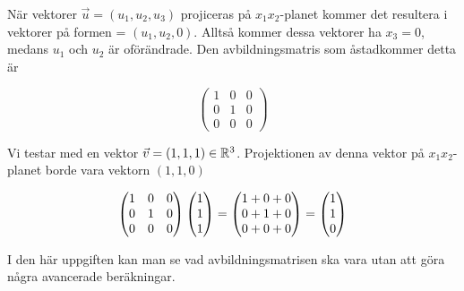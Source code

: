 \documentclass[../../main.tex]{subfiles}
\begin{document}
\begin{solution}{9}

När vektorer $\Vec{u} = (u_1, u_2, u_3)$ projiceras på $x_1x_2$-planet kommer det resultera i vektorer på formen = $(u_1, u_2, 0)$. Alltså kommer dessa vektorer ha $x_3=0$, medans $u_1$ och $u_2$ är oförändrade. Den avbildningsmatris som åstadkommer detta är

$$\begin{pmatrix}
1&0&0\\0&1&0\\0&0&0
\end{pmatrix}$$

Vi testar med en vektor $\Vec{v} = (1, 1, 1) \in \mathbb{R}^{3}$. Projektionen av denna vektor på $x_1x_2$-planet borde vara vektorn $(1, 1, 0)$

$$
\begin{pmatrix}
1&0&0\\0&1&0\\0&0&0
\end{pmatrix} \begin{pmatrix}1\\1\\1\\\end{pmatrix} =
\begin{pmatrix}1+0+0\\0+1+0\\0+0+0\end{pmatrix} = \begin{pmatrix}1\\1\\0\end{pmatrix}
$$

I den här uppgiften kan man se vad avbildningsmatrisen ska vara utan att göra några avancerade beräkningar.

\end{solution}
\end{document}
